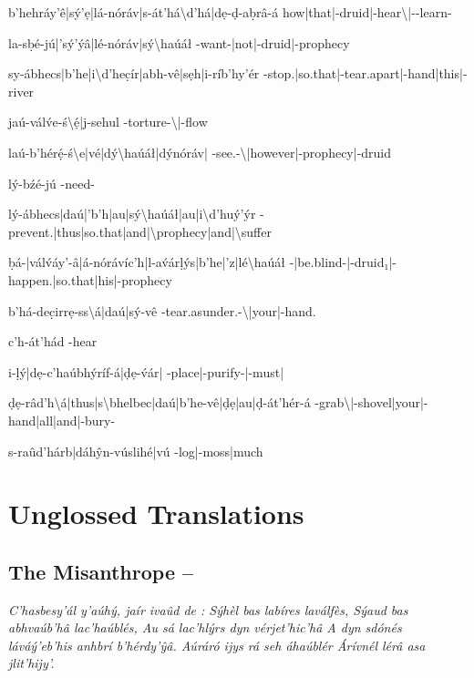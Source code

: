 \documentclass[a4paper, 12pt, twoside, openright, final]{book}
\renewenvironment {verse} {
    \ifvmode\else\unskip\par\fi
    \begingroup
        \obeylines
        \obeyspaces
        \parindent0pt
        \parskip0pt
} {
        \par
    \endgroup
}
\let \Sl \textbackslash
\begin{document}
{    b’hehráy’ê|sý’ẹ|lá-nóráv|s-át’há\Sl d’há|dẹ-ḍ-aḅrâ-á
    how|that|-druid|-hear\Sl {}|--learn-

    la-sḅé-jú|’sý’ýâ|lé-nóráv|sý\Sl haúáł
    -want-|not|-druid|-prophecy

    sy-ábhecs|b’he|i\Sl d’hec̣ír|abh-vê|sẹh|i-ríb’hy’ér
    -stop.|so.that|-tear.apart|-hand|this|-river

    jaú-válv́e-ś\Sl ẹ́|j-sehul
    -torture-\Sl {}|-flow

    laú-b’hérẹ́-ś\Sl e|vé|dý\Sl haúáł|dýnóráv|
    -see.-\Sl {}|however|-prophecy|-druid

    lý-bźé-jú
    -need-

    lý-ábhecs|daú|’b’h|au|sý\Sl haúáł|au|i\Sl d’huý’ýr
    -prevent.|thus|so.that|and|\Sl prophecy|and|\Sl suffer

    ḅá-|válv́áy’-â|á-nórávíc’h|l-av́árḷýs|b’he|’z|lé\Sl haúáł
    -|be.blind-|-druid₁|-happen.|so.that|his|-prophecy

    b’há-dec̣irrẹ-ss\Sl á|daú|sý-vê
    -tear.asunder.-\Sl {}|your|-hand.

    c’h-át’hád
    -hear

    i-ḷý|dẹ-c’haúbhýríf-á|ḍẹ-v́ár|
    -place|-purify-|-must|

    ḍẹ-râd’h\Sl á|thus|s\Sl bhelbec|daú|b’he-vê|ḍẹ|au|ḍ-át’hér-á
    -grab\Sl {}|-shovel|your|-hand|all|and|-bury-

    s-raûd’hárb|dáhŷn-vúslihé|vú
    -log|-moss|much
}

\section{Unglossed Translations}
\subsection{The Misanthrope – }
\begin{verse}\it
C’hasbesy’ál y’aúhý, jaír ivaûd de :
Sýhèl bas labíres laválfès,
Sýaud bas abhvaúb’hâ lac’haúblés,
Au sá lac’hlýrs dyn vérjet’hic’hâ
A dyn sdónés láváý’eb’his anhbrí b’hérdy’ŷâ.
Aúráró ijys rá seh áhaúblér
Árívnél lérâ asa jlit’hijy’.
\end{verse}
\end{document}
